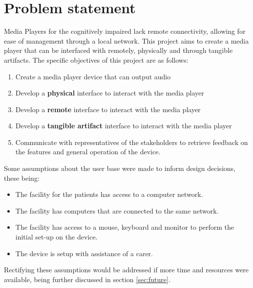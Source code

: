 \section{Problem statement}\label{sec:problem}
Media Players for the cognitively impaired lack remote connectivity, allowing for ease of management through a local network. This project aims to create a media player that can be interfaced with remotely, physically and through tangible artifacts. The specific objectives of this project are as follows:
\begin{enumerate}
    \item Create a media player device that can output audio
    \item Develop a \textbf{physical} interface to interact with the media player
    \item Develop a \textbf{remote} interface to interact with the media player
    \item Develop a \textbf{tangible artifact} interface to interact with the media player
    \item Communicate with representatives of the stakeholders to retrieve feedback on the features and general operation of the device.
\end{enumerate}

Some assumptions about the user base were made to inform design decisions, these being:
\begin{itemize}
    \item The facility for the patients has access to a computer network.
    \item The facility has computers that are connected to the same network.
    \item The facility has access to a mouse, keyboard and monitor to perform the initial set-up on the device.
    \item The device is setup with assistance of a carer.
\end{itemize}
Rectifying these assumptions would be addressed if more time and resources were available, being further discussed in section \ref{sec:future}.
